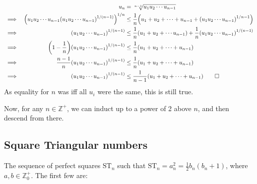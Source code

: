 \documentclass[fleqn,a4paper,11pt]{article}
\begin{document}
    \begin{alignat*}{2}
    &&u_n &= \sqrt[n - 1]{u_1 u_2 \dotsm u_{n - 1}} \\
    &\implies& \pqty{u_1 u_2 \dotsm u_{n - 1}
                \pqty{u_1 u_2 \dotsm u_{n - 1}}^{1 / (n - 1)}}^{1 / n}
             &\le \frac 1n \pqty{u_1 + u_2 + \dotsb  + u_{n - 1} +
                \pqty{u_1 u_2 \dotsm u_{n - 1}}^{1/{n - 1}}} \\
    &\implies& \pqty{u_1 u_2 \dotsm u_{n - 1}}^{1 / (n - 1)} &\le
             \frac 1n \pqty{u_1 + u_2 + \dotsb u_{n - 1}} +
             \frac 1n \pqty{u_1 u_2 \dotsm u_{n - 1}}^{1 / (n - 1)} \\
    &\implies& \pqty{1 - \frac 1n}
             \pqty{u_1 u_2 \dotsm u_{n - 1}}^{1 / (n - 1)} &\le
             \frac 1n \pqty{u_1 + u_2 + \dotsb + u_{n - 1}} \\
    &\implies& \frac {n - 1}n
             \pqty{u_1 u_2 \dotsb u_{n - 1}}^{1 / (n - 1)} &\le
             \frac 1n \pqty{u_1 + u_2 + \dotsb + u_{n - 1}} \\
    &\implies& \pqty{u_1 u_2 \dotsm u_{n - 1}}^{1 / (n - 1)} &\le
             \frac 1{n - 1} \pqty{u_1 + u_2 + \dotsb + u_{n - 1}} \qed
    \end{alignat*}
    As equality for \(n\) was iff all \(u_i\) were the same, this is still true.

    Now, for any \(n \in \mathbb Z^+\), we can induct up to a power of 2 above
    \(n\), and then descend from there.

    \subsection{Square Triangular numbers}


    The sequence of perfect squares \(\mathrm{ST}_n\) such that
    \(\mathrm{ST}_n= a_n^2 = \frac 12 b_n(b_n + 1)\), where
    \(a, b \in \mathbb Z_0^+\). The first few are:
\end{document}
